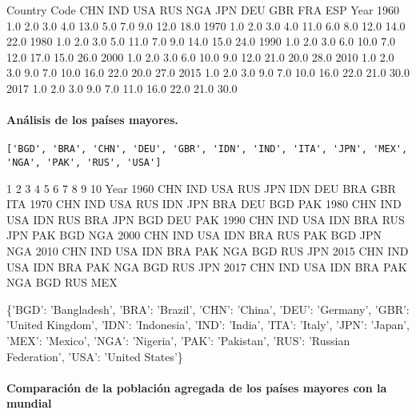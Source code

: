 \documentclass[11pt]{article}
\begin{document}
Country Code  CHN  IND  USA  RUS  NGA  JPN  DEU  GBR  FRA  ESP
Year                                                          
1960          1.0  2.0  3.0  4.0 13.0  5.0  7.0  9.0 12.0 18.0
1970          1.0  2.0  3.0  4.0 11.0  6.0  8.0 12.0 14.0 22.0
1980          1.0  2.0  3.0  5.0 11.0  7.0  9.0 14.0 15.0 24.0
1990          1.0  2.0  3.0  6.0 10.0  7.0 12.0 17.0 15.0 26.0
2000          1.0  2.0  3.0  6.0 10.0  9.0 12.0 21.0 20.0 28.0
2010          1.0  2.0  3.0  9.0  7.0 10.0 16.0 22.0 20.0 27.0
2015          1.0  2.0  3.0  9.0  7.0 10.0 16.0 22.0 21.0 30.0
2017          1.0  2.0  3.0  9.0  7.0 11.0 16.0 22.0 21.0 30.0
            
    \paragraph{Análisis de los países
mayores.}\label{anuxe1lisis-de-los-pauxedses-mayores.}

    \begin{Verbatim}[commandchars=\\\{\}]
['BGD', 'BRA', 'CHN', 'DEU', 'GBR', 'IDN', 'IND', 'ITA', 'JPN', 'MEX', 'NGA', 'PAK', 'RUS', 'USA']

    \end{Verbatim}

       1    2    3    4    5    6    7    8    9    10
Year                                                  
1960  CHN  IND  USA  RUS  JPN  IDN  DEU  BRA  GBR  ITA
1970  CHN  IND  USA  RUS  IDN  JPN  BRA  DEU  BGD  PAK
1980  CHN  IND  USA  IDN  RUS  BRA  JPN  BGD  DEU  PAK
1990  CHN  IND  USA  IDN  BRA  RUS  JPN  PAK  BGD  NGA
2000  CHN  IND  USA  IDN  BRA  RUS  PAK  BGD  JPN  NGA
2010  CHN  IND  USA  IDN  BRA  PAK  NGA  BGD  RUS  JPN
2015  CHN  IND  USA  IDN  BRA  PAK  NGA  BGD  RUS  JPN
2017  CHN  IND  USA  IDN  BRA  PAK  NGA  BGD  RUS  MEX
            
\{'BGD': 'Bangladesh',
 'BRA': 'Brazil',
 'CHN': 'China',
 'DEU': 'Germany',
 'GBR': 'United Kingdom',
 'IDN': 'Indonesia',
 'IND': 'India',
 'ITA': 'Italy',
 'JPN': 'Japan',
 'MEX': 'Mexico',
 'NGA': 'Nigeria',
 'PAK': 'Pakistan',
 'RUS': 'Russian Federation',
 'USA': 'United States'\}
            
    \paragraph{Comparación de la población agregada de los países mayores
con la
mundial}\label{comparaciuxf3n-de-la-poblaciuxf3n-agregada-de-los-pauxedses-mayores-con-la-mundial}
\end{document}
